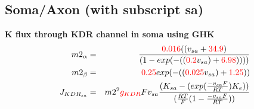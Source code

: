 \documentclass[fleqn]{report}
\numberwithin{equation}{section}
\numberwithin{equation}{section}
\begin{document}
\subsection{Soma/Axon (with subscript sa)}			

%	
           
 \textbf{K flux through KDR channel in soma using GHK}
 \begin{eqnarray}
	            m2_{\alpha}     &=& \frac{\textcolor{red}{0.016} ((v_{sa} + \textcolor{red}{34.9})}{(1 - exp(-((\textcolor{red}{0.2}  v_{sa}) + \textcolor{red}{6.98}))))}\\
	            m2_{\beta}      &=& \textcolor{red}{0.25} exp(-((\textcolor{red}{0.025}  v_{sa}) + \textcolor{red}{1.25}))\\
	            J_{KDR_{sa}}    &=& m2^2 \textcolor{red}{g_{KDR}} F v_{sa} \frac{(K_{sa} - (exp(\frac{-v_{sa} F}{RT})  K_e))}{(\frac{RT}{F} (1 - \frac{-v_{sa} F}{RT}))}\\
\end{eqnarray}
\end{document}
